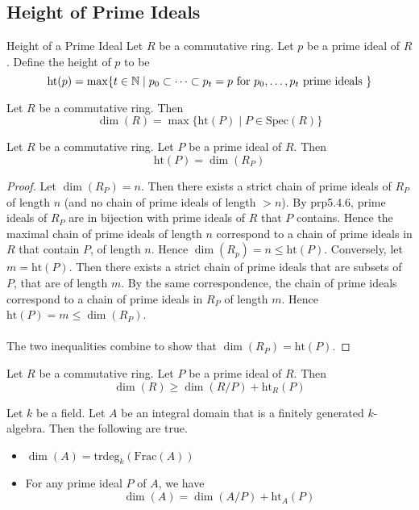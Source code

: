 \documentclass[a4paper]{article}
\begin{document}
\subsection{Height of Prime Ideals}
\begin{defn}{Height of a Prime Ideal}{} Let $R$ be a commutative ring. Let $p$ be a prime ideal of $R$. Define the height of $p$ to be $$\text{ht}(p)=\max\{t\in\mathbb{N}\;|\;p_0\subset\dots\subset p_t=p\text{ for }p_0,\dots,p_t\text{ prime ideals }\}$$
\end{defn}

\begin{lmm}{}{} Let $R$ be a commutative ring. Then $$\dim(R)=\max\{\text{ht}(P)\;|\;P\in\text{Spec}(R)\}$$
\end{lmm}

\begin{lmm}{}{} Let $R$ be a commutative ring. Let $P$ be a prime ideal of $R$. Then $$\text{ht}(P)=\dim(R_P)$$ 
\begin{proof}
Let $\dim(R_P)=n$. Then there exists a strict chain of prime ideals of $R_P$ of length $n$ (and no chain of prime ideals of length $>n$). By prp5.4.6, prime ideals of $R_P$ are in bijection with prime ideals of $R$ that $P$ contains. Hence the maximal chain of prime ideals of length $n$ correspond to a chain of prime ideals in $R$ that contain $P$, of length $n$. Hence $\dim(R_p)=n\leq\text{ht}(P)$. Conversely, let $m=\text{ht}(P)$. Then there exists a strict chain of prime ideals that are subsets of $P$, that are of length $m$. By the same correspondence, the chain of prime ideals correspond to a chain of prime ideals in $R_P$ of length $m$. Hence $\text{ht}(P)=m\leq\dim(R_P)$. \\~\\

The two inequalities combine to show that $\dim(R_P)=\text{ht}(P)$. 
\end{proof}
\end{lmm}

\begin{lmm}{}{} Let $R$ be a commutative ring. Let $P$ be a prime ideal of $R$. Then $$\dim(R)\geq\dim(R/P)+\text{ht}_R(P)$$
\end{lmm}

\begin{prp}{}{} Let $k$ be a field. Let $A$ be an integral domain that is a finitely generated $k$-algebra. Then the following are true. 
\begin{itemize}
\item $\dim(A)=\text{trdeg}_k(\text{Frac}(A))$
\item For any prime ideal $P$ of $A$, we have $$\dim(A)=\dim(A/P)+\text{ht}_A(P)$$
\end{itemize}
\end{prp}
\end{document}
